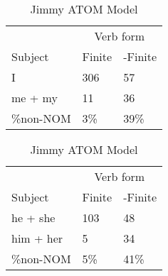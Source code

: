 \begin{table}[]
\caption{Jimmy ATOM Model}
\begin{minipage}{0.5\textwidth}
    \centering
    \begin{tabular}{@{}lll@{}}
        \toprule
         & \multicolumn{2}{c}{Verb form}\\
         \cline{2-3}
        Subject & Finite & -Finite \\
        \midrule
        I & 306 & 57 \\
        me + my & 11 & 36 \\
        \hline
        \%non-NOM & 3\% & 39\% \\
        \bottomrule
    \end{tabular}
\end{minipage}
\begin{minipage}{0.5\textwidth}
    \centering
    \begin{tabular}{@{}lll@{}}
        \toprule
         & \multicolumn{2}{c}{Verb form}\\
         \cline{2-3}
        Subject & Finite & -Finite \\
        \midrule
        he + she & 103 & 48 \\
        him + her & 5 & 34 \\
        \hline
        \%non-NOM & 5\% & 41\% \\
        \bottomrule
    \end{tabular}
    \end{minipage}


\end{table}
